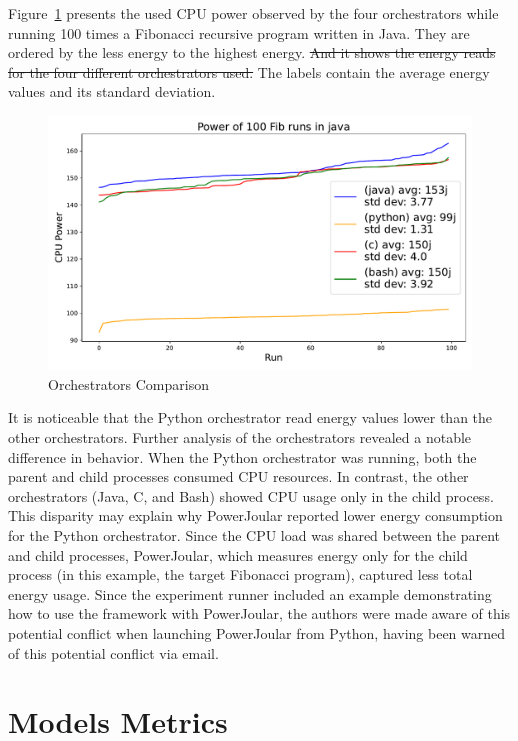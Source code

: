 Figure~\ref{fig:4_orchs_comparison} presents the used CPU power observed by the four orchestrators while running 
 100 times a Fibonacci recursive program written in Java. They are ordered by the less energy to the highest energy. \st{And it shows the energy reads for the four different orchestrators used.} The labels contain the average energy values and its standard deviation.

\begin{figure}[htbp]
  \centering
  \includegraphics[width = .8 \textwidth]{figures/4_orchs_comparison.pdf}
  \caption{Orchestrators Comparison}
  \label{fig:4_orchs_comparison}
\end{figure}

It is noticeable that the Python orchestrator read energy values lower than the other orchestrators. Further analysis of the orchestrators revealed a notable difference in behavior. When the Python orchestrator was running, both the parent and child processes consumed CPU resources. In contrast, the other orchestrators (Java, C, and Bash) showed CPU usage only in the child process. This disparity may explain why PowerJoular reported lower energy consumption for the Python orchestrator. Since the CPU load was shared between the parent and child processes, PowerJoular, which measures energy only for the child process (in this example, the target Fibonacci program), captured less total energy usage.
Since the experiment runner included an example demonstrating how to use the framework with PowerJoular, the authors were made aware of this potential conflict when launching PowerJoular from Python, {\color{blue}having been warned of this potential conflict via email}.


\section{Models Metrics} \label{sec:models_metrics}


